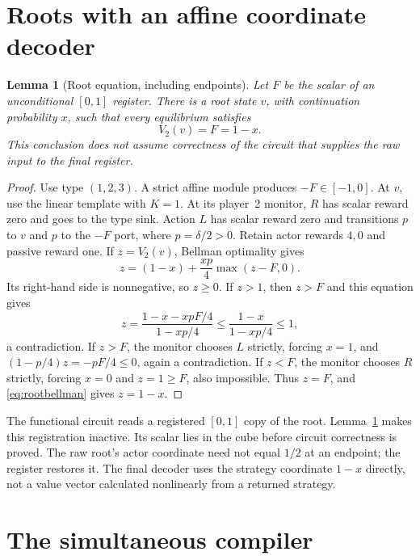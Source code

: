 \documentclass[11pt,a4paper]{article}
\numberwithin{equation}{section}
\newtheorem{lemma}[theorem]{Lemma}
\theoremstyle{definition}
\begin{document}
\section{Roots with an affine coordinate decoder}\label{sec:roots}

\begin{lemma}[Root equation, including endpoints]\label{lem:root}
Let \(F\) be the scalar of an unconditional \([0,1]\) register. There
is a root state \(v\), with continuation probability \(x\), such that
every equilibrium satisfies
\begin{equation}\label{eq:decode}
 V_2(v)=F=1-x.
\end{equation}
This conclusion does not assume correctness of the circuit that supplies
the raw input to the final register.
\end{lemma}
\begin{proof}
Use type \((1,2,3)\). A strict affine module produces \(-F\in[-1,0]\).
At \(v\), use the linear template with \(K=1\). At its player~2
monitor, \(R\) has scalar reward zero and goes to the type sink.
Action \(L\) has scalar reward zero and transitions \(p\) to \(v\)
and \(p\) to the \(-F\) port, where \(p=\delta/2>0\).
Retain actor rewards \(4,0\) and passive reward one. If \(z=V_2(v)\),
Bellman optimality gives
\begin{equation}\label{eq:rootbellman}
 z=(1-x)+\frac{xp}{4}\max(z-F,0).
\end{equation}
Its right-hand side is nonnegative, so \(z\geq0\). If \(z>1\), then
\(z>F\) and this equation gives
\[
 z=\frac{1-x-xpF/4}{1-xp/4}
   \leq\frac{1-x}{1-xp/4}\leq1,
\]
a contradiction.
If \(z>F\), the monitor chooses \(L\) strictly, forcing \(x=1\),
and \((1-p/4)z=-pF/4\leq0\), again a contradiction.
If \(z<F\), the monitor chooses \(R\) strictly, forcing \(x=0\)
and \(z=1\geq F\), also impossible. Thus \(z=F\), and
\eqref{eq:rootbellman} gives \(z=1-x\).
\end{proof}

The functional circuit reads a registered \([0,1]\) copy of the root.
Lemma~\ref{lem:root} makes this registration inactive. Its scalar lies
in the cube before circuit correctness is proved. The raw root's actor
coordinate need not equal \(1/2\) at an endpoint; the register restores
it. The final decoder uses the strategy coordinate \(1-x\) directly,
not a value vector calculated nonlinearly from a returned strategy.

\section{The simultaneous compiler}\label{sec:compiler}
\end{document}
